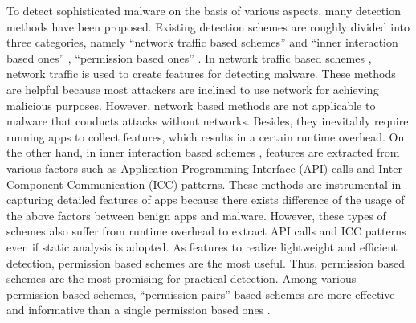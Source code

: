 \documentclass{ieeeaccess}
\begin{document}
To detect sophisticated malware on the basis of various aspects, many detection methods have been proposed.
Existing detection schemes are roughly divided into three categories, namely ``network traffic based schemes'' \cite{wang2018detecting,garg2017network} and ``inner interaction based ones'' \cite{aafer2013droidapiminer, deshotels2014droidlegacy, xu2016iccdetector, cai2018droidcat}, ``permission based ones'' \cite{sanz2013puma, li2018significant, liang2014permission, liu2014two, arora2019permpair}.
In network traffic based schemes \cite{wang2018detecting,garg2017network}, network traffic is used to create features for detecting malware.
These methods are helpful because most attackers are inclined to use network for achieving malicious purposes.  
However, network based methods are not applicable to malware that conducts attacks without networks.
Besides, they inevitably require running apps to collect features, which results in a certain runtime overhead.  
On the other hand, in inner interaction based schemes \cite{aafer2013droidapiminer, deshotels2014droidlegacy, xu2016iccdetector, cai2018droidcat}, features are extracted from various factors such as Application Programming Interface (API) calls and Inter-Component Communication (ICC) patterns.
These methods are instrumental in capturing detailed features of apps because there exists difference of the usage of the above factors between benign apps and malware. 
However, these types of schemes also suffer from runtime overhead to extract API calls and ICC patterns even if static analysis is adopted.
As features to realize lightweight and efficient detection, permission based schemes \cite{sanz2013puma, li2018significant, liang2014permission, liu2014two, arora2019permpair} are the most useful.
Thus, permission based schemes are the most promising for practical detection.
Among various permission based schemes, ``permission pairs'' based schemes \cite{liang2014permission, liu2014two, arora2019permpair} are more effective and informative than a single permission based ones \cite{sanz2013puma, li2018significant}.
\end{document}
